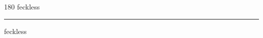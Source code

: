 
\begin{frame}
\begin{center}
\begin{turn}{180}
{\fontsize{2.5cm}{1em}\selectfont feckless}
\end{turn}
\vspace{1em}\par  
\hrule
\vspace{1em}\par  
{\fontsize{2.5cm}{1em}\selectfont feckless}
\end{center}
\end{frame}
